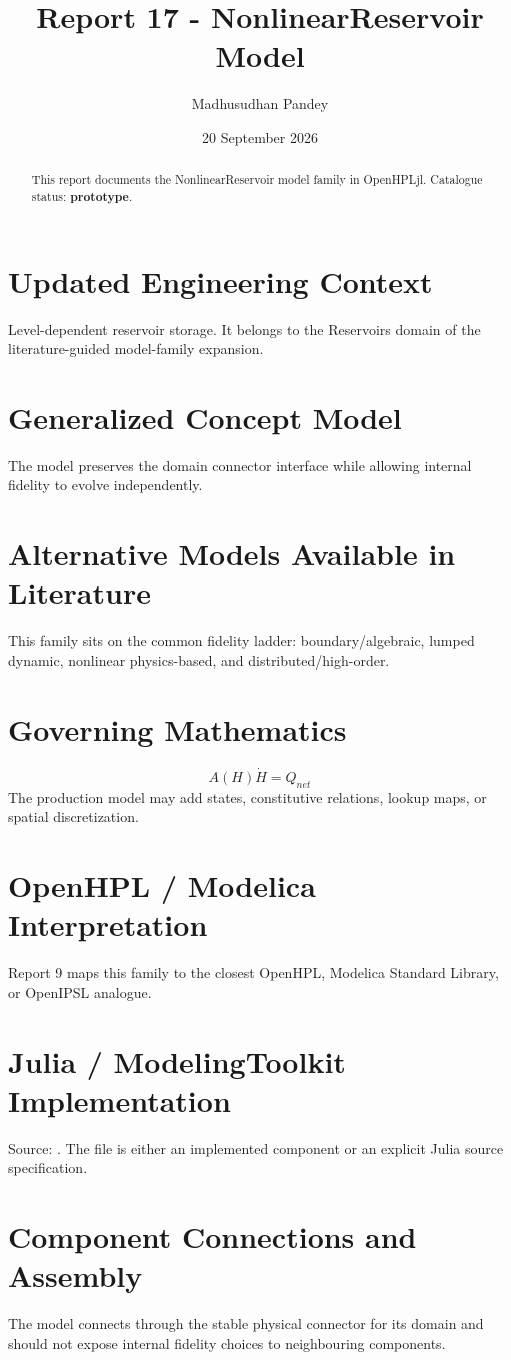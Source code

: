 \documentclass[10pt,a4paper]{article}
\title{Report 17 - NonlinearReservoir Model}
\author{Madhusudhan Pandey}
\date{20 September 2026}
\begin{document}
\maketitle
\begin{abstract}
This report documents the NonlinearReservoir model family in OpenHPLjl. Catalogue status: \textbf{prototype}.
\end{abstract}
\section{Updated Engineering Context}
Level-dependent reservoir storage. It belongs to the Reservoirs domain of the literature-guided model-family expansion.
\section{Generalized Concept Model}
The model preserves the domain connector interface while allowing internal fidelity to evolve independently.
\section{Alternative Models Available in Literature}
This family sits on the common fidelity ladder: boundary/algebraic, lumped dynamic, nonlinear physics-based, and distributed/high-order.
\section{Governing Mathematics}
\[A(H)\dot H=Q_{net}\]
The production model may add states, constitutive relations, lookup maps, or spatial discretization.
\section{OpenHPL / Modelica Interpretation}
Report 9 maps this family to the closest OpenHPL, Modelica Standard Library, or OpenIPSL analogue.
\section{Julia / ModelingToolkit Implementation}
Source: \texttt{}. The file is either an implemented component or an explicit Julia source specification.
\section{Component Connections and Assembly}
The model connects through the stable physical connector for its domain and should not expose internal fidelity choices to neighbouring components.
\end{document}
